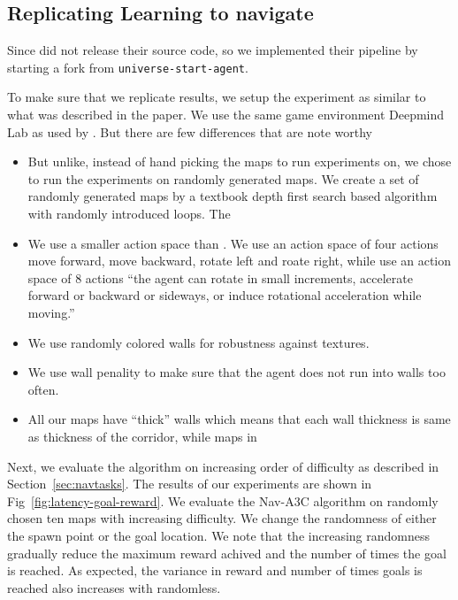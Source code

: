 \subsection{Replicating Learning to navigate}
Since \cite{MiPaViICLR2017} did not release their source code, so we implemented their pipeline by starting a fork from \texttt{universe-start-agent}\cite{OpenAI2017UniverseStarterAgent}.

To make sure that we replicate \cite{MiPaViICLR2017} results, we setup the experiment as similar to what was described in the paper. We use the same game environment Deepmind Lab \cite{BeLeTeARXIV2016} as used by \cite{MiPaViICLR2017}. But there are few differences that are note worthy
\begin{itemize}
\item But unlike, \cite{MiPaViICLR2017} instead of hand picking the maps to run experiments on, we chose to run the experiments on randomly generated maps.
We create a set of randomly generated maps by a textbook depth first search based algorithm with randomly introduced loops. The 
\item We use a smaller action space than \cite{MiPaViICLR2017}. We use an action space of four actions move forward, move backward, rotate left and roate right, while \cite{MiPaViICLR2017} use an action space of 8 actions ``the agent can rotate in small increments, accelerate forward or backward or
sideways, or induce rotational acceleration while moving.''
\item We use randomly colored walls for robustness against textures.
\item We use wall penality to make sure that the agent does not run into walls too often.
\item All our maps have ``thick'' walls which means that each wall thickness is same as thickness of the corridor, while maps in \cite{MiPaViICLR2017}
\end{itemize}

Next, we evaluate the algorithm on increasing order of difficulty as described in Section~\ref{sec:navtasks}. The results of our experiments are shown in Fig~\ref{fig:latency-goal-reward}.
We evaluate the Nav-A3C\cite{MiPaViICLR2017} algorithm on randomly chosen ten maps with increasing difficulty.
We change the randomness of either the spawn point or the goal location.
We note that the increasing randomness gradually reduce the maximum reward achived and the number of times the goal is reached. As expected, the variance in reward and number of times goals is reached also increases with randomless.

